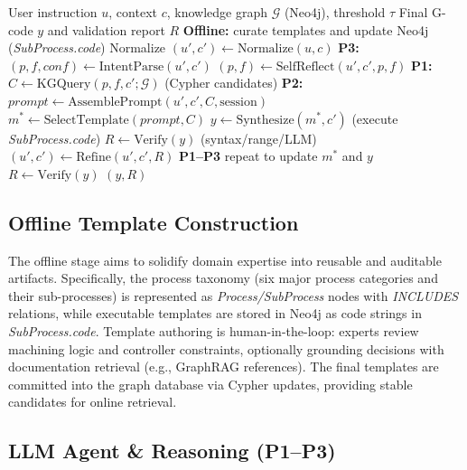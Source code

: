 \documentclass[journal,twoside,web]{ieeecolor}
\begin{document}
\begin{algorithm}[!t]
\caption{Closed-loop knowledge-graph-enhanced G-code generation (P1--P3)}
\label{alg:closed-loop-gcode}
\begin{algorithmic}[1]
\REQUIRE User instruction $u$, context $c$, knowledge graph $\mathcal{G}$ (Neo4j), threshold $\tau$
\ENSURE Final G-code $y$ and validation report $R$
\STATE \textbf{Offline:} curate templates and update Neo4j (\textit{SubProcess.code})
\STATE Normalize $(u', c') \leftarrow \text{Normalize}(u,c)$
\STATE \textbf{P3:} $(p,f,conf) \leftarrow \text{IntentParse}(u', c')$
  \STATE $(p,f) \leftarrow \text{SelfReflect}(u', c', p,f)$
\ENDIF
\STATE \textbf{P1:} $C \leftarrow \text{KGQuery}(p,f,c';\mathcal{G})$ \hfill (Cypher candidates)
\STATE \textbf{P2:} $prompt \leftarrow \text{AssemblePrompt}(u',c',C,\text{session})$
\STATE $m^{\ast} \leftarrow \text{SelectTemplate}(prompt, C)$
\STATE $y \leftarrow \text{Synthesize}(m^{\ast}, c')$ \hfill (execute \textit{SubProcess.code})
\STATE $R \leftarrow \text{Verify}(y)$ \hfill (syntax/range/LLM)
  \STATE $(u',c') \leftarrow \text{Refine}(u',c',R)$
  \STATE \textbf{P1--P3} repeat to update $m^{\ast}$ and $y$
  \STATE $R \leftarrow \text{Verify}(y)$
\ENDWHILE
\RETURN $(y, R)$
\end{algorithmic}
\end{algorithm}

\subsection{Offline Template Construction}

The offline stage aims to solidify domain expertise into reusable and auditable artifacts. Specifically, the process taxonomy (six major process categories and their sub-processes) is represented as \textit{Process/SubProcess} nodes with \textit{INCLUDES} relations, while executable templates are stored in Neo4j as code strings in \textit{SubProcess.code}. Template authoring is human-in-the-loop: experts review machining logic and controller constraints, optionally grounding decisions with documentation retrieval (e.g., GraphRAG references). The final templates are committed into the graph database via Cypher updates, providing stable candidates for online retrieval.

\subsection{LLM Agent \& Reasoning (P1--P3)}
\end{document}
